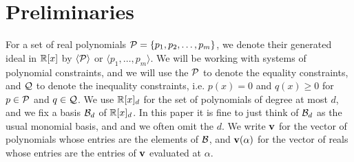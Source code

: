 \section{Preliminaries}
\label{sec:prelims}
For a set of real polynomials $\mathcal P = \{p_1, p_2, \dots, p_m\}$, we denote their generated ideal in $\mathbb R[x]$ by $\langle \mathcal P\rangle$ or $\langle p_1, \dots, p_m\rangle$. We will be working with systems of polynomial constraints, and we will use the $\mathcal P$ to denote the equality constraints, and $\mathcal Q$ to denote the inequality constraints, i.e. $p(x) = 0$ and $q(x) \geq 0$ for $p \in \mathcal P$ and $q \in \mathcal Q$. We use $\mathbb R[x]_d$ for the set of polynomials of degree at most $d$, and we fix a basis $\mathcal B_d$ of $\mathbb R[x]_d$. In this paper it is fine to just think of $\mathcal B_d$ as the usual monomial basis, and and we often omit the $d$. We write ${\bf v}$ for the vector of polynomials whose entries are the elements of $\mathcal B$, and ${\bf v}(\alpha)$ for the vector of reals whose entries are the entries of ${\bf v}$ evaluated at $\alpha$. 


